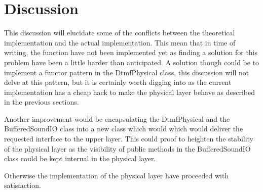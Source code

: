 \section{Discussion}
This discussion will elucidate some of the conflicts between the theoretical implementation and the actual implementation. This mean that in time of writing, the  function have not been implemented yet as finding a solution for this problem have been a little harder than anticipated. A solution though could be to implement a functor pattern in the DtmfPhysical class, this discussion will not delve at this pattern, but it is certainly worth digging into as the current implementation has a cheap hack to make the physical layer behave as described in the previous sections.

Another improvement would be encapsulating the DtmfPhysical and the BufferedSoundIO class into a new class which would which would deliver the requested interface to the upper layer. This could proof to heighten the stability of the physical layer as the visibility of public methods in the BufferedSoundIO class could be kept internal in the physical layer.

Otherwise the implementation of the physical layer have proceeded with satisfaction.